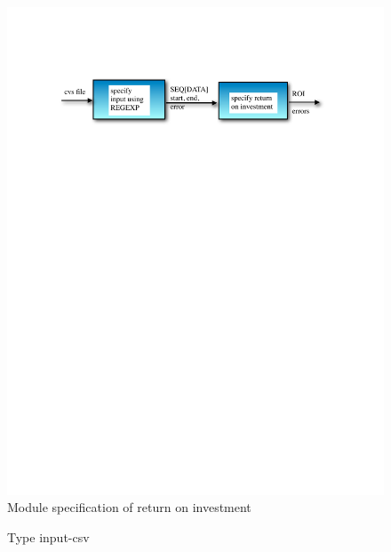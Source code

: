 \documentclass[runningheads,12pt]{article}
\begin{document}
\begin{figure}
\centering
\includegraphics[scale=0.8]{inputs/spec.pdf}

\caption{Module specification of return on investment}
\end{figure}

\begin{figure}

\caption{Type input-csv}
\label{fig:input}
\end{figure}

\newpage
\newcommand{\tab}{\hspace*{2em}}
\end{document}
